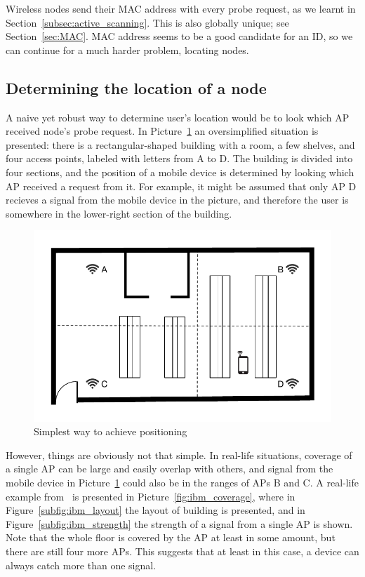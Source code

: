 \documentclass[12pt,a4paper,oneside,pdftex]{report}
\begin{document}
Wireless nodes send their MAC address with every probe request, as we learnt in Section~\ref{subsec:active_scanning}. This is also globally unique; see Section~\ref{sec:MAC}. MAC address seems to be a good candidate for an ID, so we can continue for a much harder problem, locating nodes.

\subsection{Determining the location of a node}
\label{sec:location}

A naive yet robust way to determine user's location would be to look which AP received node's probe request. In Picture~\ref{fig:position_1} an oversimplified situation is presented: there is a rectangular-shaped building with a room, a few shelves, and four access points, labeled with letters from A to D. The building is divided into four sections, and the position of a mobile device is determined by looking which AP received a request from it. For example, it might be assumed that only AP D recieves a signal from the mobile device in the picture, and therefore the user is somewhere in the lower-right section of the building.

\begin{figure}
    \label{fig:position_1}
    \includegraphics{images/positioning_1.pdf}
    \caption{Simplest way to achieve positioning}
\end{figure}

However, things are obviously not that simple. In real-life situations, coverage of a single AP can be large and easily overlap with others, and signal from the mobile device in Picture~\ref{fig:position_1} could also be in the ranges of APs B and C. A real-life example from~\cite{xiang2004} is presented in Picture~\ref{fig:ibm_coverage}, where in Figure~\ref{subfig:ibm_layout} the layout of building is presented, and in Figure~\ref{subfig:ibm_strength} the strength of a signal from a single AP is shown. Note that the whole floor is covered by the AP at least in some amount, but there are still four more APs. This suggests that at least in this case, a device can always catch more than one signal.
\end{document}
